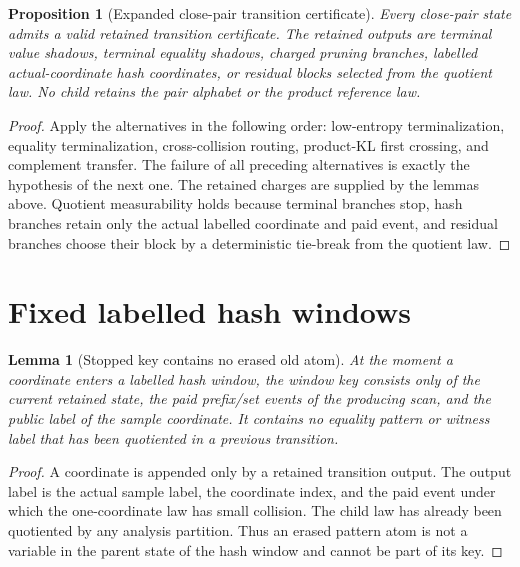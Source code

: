 \documentclass[11pt]{article}
\newtheorem{lemma}[theorem]{Lemma}
\newtheorem{proposition}[theorem]{Proposition}
\theoremstyle{remark}
\begin{document}
\begin{proposition}[Expanded close-pair transition certificate]\label{prop:app-close-pair-certificate}
Every close-pair state admits a valid retained transition certificate.  The retained outputs are terminal value shadows, terminal equality shadows, charged pruning branches, labelled actual-coordinate hash coordinates, or residual blocks selected from the quotient law.  No child retains the pair alphabet or the product reference law.
\end{proposition}

\begin{proof}
Apply the alternatives in the following order: low-entropy terminalization, equality terminalization, cross-collision routing, product-KL first crossing, and complement transfer.  The failure of all preceding alternatives is exactly the hypothesis of the next one.  The retained charges are supplied by the lemmas above.  Quotient measurability holds because terminal branches stop, hash branches retain only the actual labelled coordinate and paid event, and residual branches choose their block by a deterministic tie-break from the quotient law.
\end{proof}

\section{Fixed labelled hash windows}\label{app:hash}

\begin{lemma}[Stopped key contains no erased old atom]\label{lem:app-hash-key-clean}
At the moment a coordinate enters a labelled hash window, the window key consists only of the current retained state, the paid prefix/set events of the producing scan, and the public label of the sample coordinate.  It contains no equality pattern or witness label that has been quotiented in a previous transition.
\end{lemma}

\begin{proof}
A coordinate is appended only by a retained transition output.  The output label is the actual sample label, the coordinate index, and the paid event under which the one-coordinate law has small collision.  The child law has already been quotiented by any analysis partition.  Thus an erased pattern atom is not a variable in the parent state of the hash window and cannot be part of its key.
\end{proof}
\end{document}
